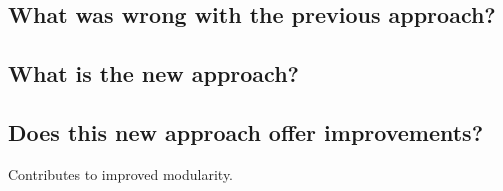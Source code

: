 \subsection{What was wrong with the previous approach?}

\subsection{What is the new approach?}

\subsection{Does this new approach offer improvements?}

Contributes to improved modularity.

%
%
%
%
%
%
%
%